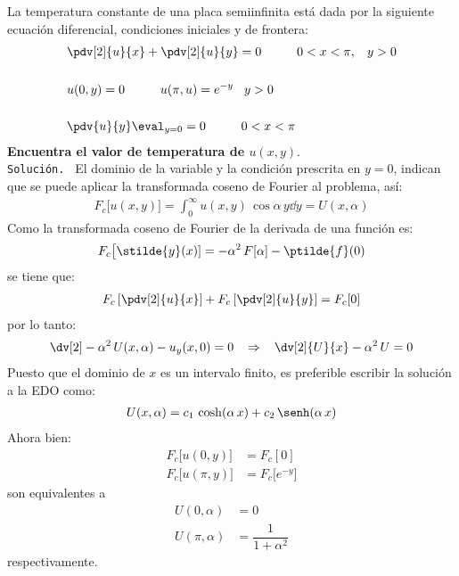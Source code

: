 La temperatura constante de una placa semiinfinita está dada por la siguiente ecuación diferencial, condiciones iniciales y de frontera:
\begin{align*}
&\pdv[2]{u}{x} + \pdv[2]{u}{y} = 0 \hspace{1cm} 0 < x < \pi, \hspace{0.3cm} y > 0 \\[0.5cm]
&u(0, y) = 0 \hspace{1cm} u(\pi, u) = e^{-y} \hspace{0.3cm} y > 0 \\[0.5cm]
&\pdv{u}{y} \eval_{y=0} = 0 \hspace{1cm} 0 < x < \pi
\end{align*}
\textbf{Encuentra el valor de temperatura de $u(x,y)$}.
\\[0.5em]
\texttt{Solución. } El dominio de la variable y la condición prescrita en $y = 0$, indican que se puede aplicar la transformada coseno de Fourier al problema, así:
\begin{align*}
F_{c} \big[u(x,y)\big] = \int_{0}^{\infty} u(x, y) \, \cos \alpha \, y \dd{y} = U(x, \alpha)
\end{align*}
Como la transformada coseno de Fourier de la derivada de una función es:
\begin{align*}
F_{c} \big[\stilde{y}(x)] = - \alpha^{2} \, F[\alpha] - \ptilde{f} (0)
\end{align*}
se tiene que:
\begin{align*}
F_{c} \left[\pdv[2]{u}{x} \right] + F_{c} \left[\pdv[2]{u}{y} \right] = F_{c} [0]
\end{align*}
por lo tanto:
\begin{align*}
\dv[2] - \alpha^{2} \, U(x, \alpha) - u_{y} (x, 0) = 0 \hspace{0.3cm} \Rightarrow \hspace{0.3cm} \dv[2]{U}{x} - \alpha^{2} \, U = 0
\end{align*}
Puesto que el dominio de $x$ es un intervalo finito, es preferible escribir la solución a la EDO como:
\begin{align}
U(x, \alpha) = c_{1} \, \cosh (\alpha \, x) + c_{2} \, \senh (\alpha \, x)
\label{eq:ecuacion_016}
\end{align}
Ahora bien:
\begin{align*}
F_{c} \big[ u(0, y)\big] &= F_{c} [0] \\[0.5em]
F_{c} \big[ u(\pi, y)\big] &= F_{c} \big[ e^{-y} \big]
\end{align*}
son equivalentes a
\begin{align*}
U(0, \alpha) &= 0 \\[0.5em]
U(\pi, \alpha) &= \dfrac{1}{1 +  \alpha^{2}}
\end{align*}
respectivamente.

